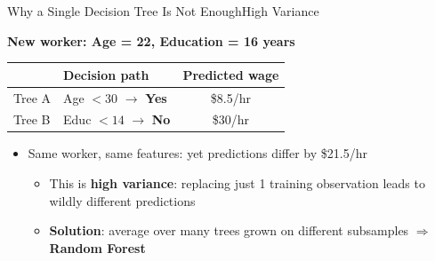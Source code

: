 \documentclass[hyperref={pdfpagelabels=false}]{beamer}
\begin{document}
\begin{frame}{Why a Single Decision Tree Is Not Enough}{High Variance}

\begin{center}
  \textbf{New worker: Age = 22, Education = 16 years}\\[8pt]
  \small
  \begin{tabular}{@{}llc@{}}
    \toprule
     & Decision path & Predicted wage \\
    \midrule
    Tree A & Age $< 30$ $\to$ \textbf{Yes} & \$8.5/hr \\
    Tree B & Educ $< 14$ $\to$ \textbf{No} & \$30/hr \\
    \bottomrule
  \end{tabular}
\end{center}

\vspace{0.2cm}
\begin{itemize}
  \item Same worker, same features: yet predictions differ by \$21.5/hr
  \begin{itemize}

  \vspace{0.2cm}

  \item This is \textbf{high variance}: replacing just 1 training observation leads to wildly different predictions
  \vspace{0.2cm}

  \item \textbf{Solution}: average over many trees grown on different subsamples $\Rightarrow$ \textbf{Random Forest}
  \end{itemize}

\end{itemize}
\end{frame}
\end{document}
